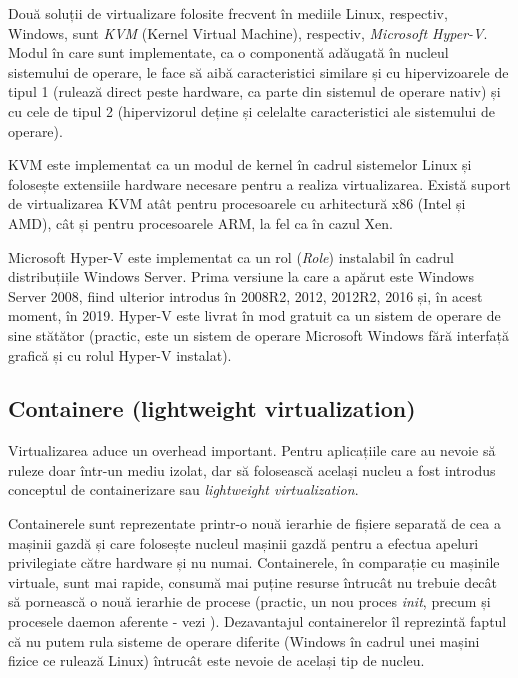 Două soluții de virtualizare folosite frecvent în mediile Linux, respectiv, Windows, sunt \textit{KVM}  (Kernel Virtual Machine), respectiv, \textit{Microsoft Hyper-V}.
 Modul în care sunt implementate, ca o componentă adăugată în nucleul sistemului de operare, le face să aibă caracteristici similare și cu hipervizoarele de tipul 1 (rulează direct peste hardware, ca parte din sistemul de operare nativ) și cu cele de tipul 2 (hipervizorul deține și celelalte caracteristici ale sistemului de operare).

KVM este implementat ca un modul de kernel în cadrul sistemelor Linux și folosește extensiile hardware necesare pentru a realiza virtualizarea.
 Există suport de virtualizarea KVM atât pentru procesoarele cu arhitectură x86 (Intel și AMD), cât și pentru procesoarele ARM, la fel ca în cazul Xen.

Microsoft Hyper-V este implementat ca un rol (\textit{Role}) instalabil în cadrul distribuțiile Windows Server.
 Prima versiune la care a apărut este Windows Server 2008, fiind ulterior introdus în 2008R2, 2012, 2012R2, 2016 și, în acest moment, în 2019.
 Hyper-V este livrat în mod gratuit ca un sistem de operare de sine stătător (practic, este un sistem de operare Microsoft Windows fără interfață grafică și cu rolul Hyper-V instalat).

\subsection{Containere (lightweight virtualization)}
\label{sec:vm:concepts:containers}

Virtualizarea aduce un overhead important.
Pentru aplicațiile care au nevoie să ruleze doar într-un mediu izolat, dar să folosească același nucleu a fost introdus conceptul de containerizare sau \textit{lightweight virtualization}.

Containerele sunt reprezentate printr-o nouă ierarhie de fișiere separată de cea a mașinii gazdă și care folosește nucleul mașinii gazdă pentru a efectua apeluri privilegiate către hardware și nu numai.
 Containerele, în comparație cu mașinile virtuale, sunt mai rapide, consumă mai puține resurse întrucât nu trebuie decât să pornească o nouă ierarhie de procese (practic, un nou proces \textit{init}, precum și procesele daemon aferente - vezi ).
Dezavantajul containerelor îl reprezintă faptul că nu putem rula sisteme de operare diferite (Windows în cadrul unei mașini fizice ce rulează Linux) întrucât este nevoie de același tip de nucleu.

